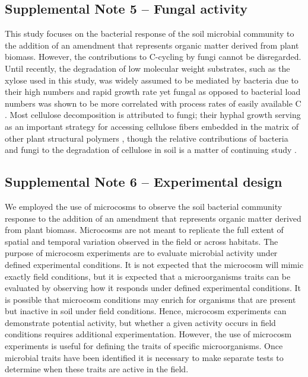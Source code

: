 \documentclass{article}
\begin{document}
\subsection{Supplemental Note 5 -- Fungal activity}
This study focuses on the bacterial response of the soil microbial community to
the addition of an amendment that represents organic matter derived from plant
biomass. However, the contributions to C-cycling by fungi cannot be
disregarded. Until recently, the degradation of low molecular weight
substrates, such as the xylose used in this study, was widely assumed to be
mediated by bacteria due to their high numbers and rapid growth rate
\citep{boer_2005} yet fungal as opposed to bacterial load  numbers was shown
to be more correlated with process rates of easily available C \citep{rousk_2015}.
Most cellulose decomposition is attributed to fungi; their hyphal
growth serving as an important strategy for accessing cellulose fibers embedded
in the matrix of other plant structural polymers \citep{Lynd2002}, though the
relative contributions of bacteria and fungi to the degradation of cellulose in
soil is a matter of continuing study \citep{rousk_2015}. 

\subsection{Supplemental Note 6 -- Experimental design}
We employed the use of microcosms to observe the soil bacterial community
response to the addition of an amendment that represents organic matter derived
from plant biomass. Microcosms are not meant to replicate the full extent of
spatial and temporal variation observed in the field or across habitats. The
purpose of microcosm experiments are to evaluate microbial activity
under defined experimental conditions. It is not expected that the microcosm
will mimic exactly field conditions, but it is expected that a microorganisms
traits can be evaluated by observing how it responds under defined
experimental conditions. It is possible that microcosm conditions may enrich
for organisms that are present but inactive in soil under field conditions.
Hence, microcosm experiments can demonstrate potential activity, but whether a
given activity occurs in field conditions requires additional experimentation.
However, the use of microcosm experiments is useful for defining the
traits of specific microorganisms. Once microbial traits have been identified
it is necessary to make separate tests to determine when these traits are
active in the field.
\end{document}
